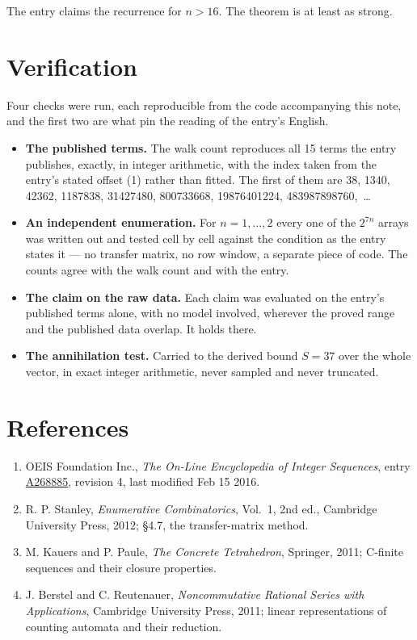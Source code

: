 \documentclass[11pt]{article}
\theoremstyle{definition}
\begin{document}
The entry claims the recurrence for $n > 16$. The theorem is at least as strong.

\section{Verification}

Four checks were run, each reproducible from the code accompanying this note, and the first two are what pin the reading of the entry's English.

\begin{itemize}

\item {\bfseries The published terms.} The walk count reproduces all 15 terms the entry publishes, exactly, in integer arithmetic, with the index taken from the entry's stated offset (1) rather than fitted. The first of them are 38, 1340, 42362, 1187838, 31427480, 800733668, 19876401224, 483987898760,~\dots

\item {\bfseries An independent enumeration.} For $n = 1,\dots,2$ every one of the $2^{7n}$ arrays was written out and tested cell by cell against the condition as the entry states it --- no transfer matrix, no row window, a separate piece of code. The counts agree with the walk count and with the entry.

\item {\bfseries The claim on the raw data.} Each claim was evaluated on the entry's published terms alone, with no model involved, wherever the proved range and the published data overlap. It holds there.

\item {\bfseries The annihilation test.} Carried to the derived bound $S = 37$ over the whole vector, in exact integer arithmetic, never sampled and never truncated.

\end{itemize}

\section{References}

\begin{enumerate}

\item OEIS Foundation Inc., \emph{The On-Line Encyclopedia of Integer Sequences}, entry \href{https://oeis.org/A268885}{A268885}, revision 4, last modified Feb 15 2016.

\item R. P. Stanley, \emph{Enumerative Combinatorics}, Vol.~1, 2nd ed., Cambridge University Press, 2012; \S4.7, the transfer-matrix method.

\item M. Kauers and P. Paule, \emph{The Concrete Tetrahedron}, Springer, 2011; C-finite sequences and their closure properties.

\item J. Berstel and C. Reutenauer, \emph{Noncommutative Rational Series with Applications}, Cambridge University Press, 2011; linear representations of counting automata and their reduction.

\end{enumerate}
\end{document}
